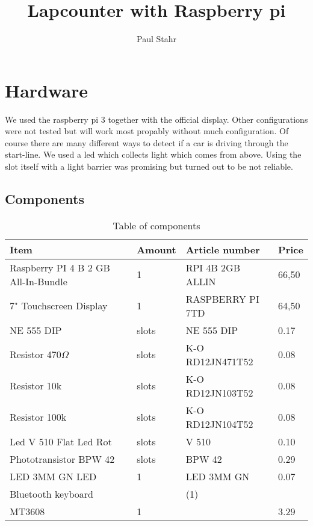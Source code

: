 \documentclass[11pt, a4paper, UKenglish, parskip=half+]{scrbook}
\author{Paul Stahr}
\title{Lapcounter with Raspberry pi}
\newcommand{\slots}{slots}
\begin{document}
\maketitle
\chapter{Hardware}
We used the raspberry pi 3 together with the official display. Other configurations were not tested but will work most propably without much configuration. Of course there are many different ways to detect if a car is driving through the start-line. We used a led which collects light which comes from above. Using the slot itself with a light barrier was promising but turned out to be not reliable.
\section{Components}
\begin{table}[H]
\begin{tabular}{l l l l}
Item& Amount & Article number & Price\\\hline
Raspberry PI 4 B 2 GB All-In-Bundle & 1 &RPI 4B 2GB ALLIN &66,50 \\
7" Touchscreen Display & 1 & RASPBERRY PI 7TD&64,50\\
NE 555 DIP & \slots &NE 555 DIP& 0.17 \\
Resistor 470$\Omega$ & \slots&K-O RD12JN471T52&0.08 \\
Resistor 10k & \slots& K-O RD12JN103T52 & 0.08\\
Resistor 100k & \slots& K-O RD12JN104T52& 0.08 \\
Led V 510 Flat Led Rot& \slots &V 510& 0.10 \\
Phototransistor BPW 42 & \slots& BPW 42& 0.29\\
LED 3MM GN LED & 1& LED 3MM GN& 0.07\\
Bluetooth keyboard& & (1) \\
MT3608 & 1& & 3.29\\
\end{tabular}
\caption{Table of components}
\end{table}

\end{document}
